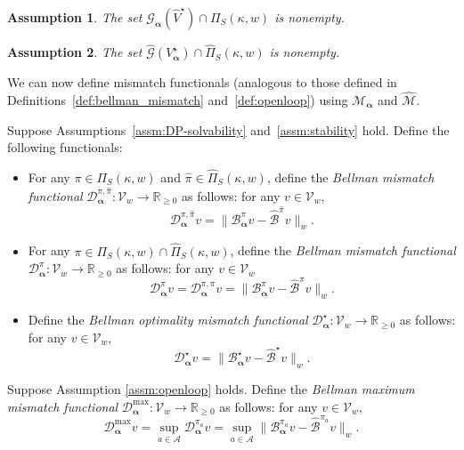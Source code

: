 \documentclass[letterpaper, 10pt]{IEEEtran}
\newtheorem{assumption}{Assumption}
\newcommand*\ALPHABET{\mathcal}
\newcommand*\reals{\mathds{R}}
\newcommand*\BELLMAN{\mathscr{B}}
\newcommand*\MISMATCH{\mathscr{D}}
\newcommand*\tuple{\kappa, w}
\begin{document}
\begin{assumption}\label{ass:N1_alt}
    The set $\ALPHABET G_{\boldsymbol{\alpha}}(\hat V^\star) \cap  \Pi_S(\tuple)$ is nonempty.
\end{assumption}
\begin{assumption}\label{ass:N2_alt}
    The set $\hat {\ALPHABET G}(V_{\boldsymbol{\alpha}}^\star) \cap  \hat \Pi_S(\tuple)$ is nonempty.
\end{assumption}
 
 We can now define mismatch functionals (analogous to those defined in Definitions~\ref{def:bellman_mismatch} and~\ref{def:openloop}) using $\ALPHABET M_{\boldsymbol{\alpha}}$ and $\hat {\ALPHABET M}$.
 
 \begin{definition}
\label{def:bellman_mismatch_alpha}
Suppose Assumptions~\ref{assm:DP-solvability} and~\ref{assm:stability} hold. Define the following functionals:
\begin{itemize}
    \item For any $\pi \in \Pi_S(\tuple)$ and $\hat\pi \in \hat \Pi_S(\tuple)$, define the \emph{Bellman mismatch functional}  $\MISMATCH_{\boldsymbol{\alpha}}^{\pi,\hat\pi} \colon \ALPHABET V_w \to \reals_{\ge 0}$  as follows: for any $v \in \ALPHABET V_w$,
    \[
        \MISMATCH^{\pi,\hat\pi}_{\boldsymbol{\alpha}} v = \| \BELLMAN^{\pi}_{\boldsymbol{\alpha}} v - \hat{\BELLMAN}^{\hat \pi} v \|_w.
    \]

    \item For any $\pi \in \Pi_S(\tuple) \cap \hat \Pi_S(\tuple)$, define the \emph{Bellman mismatch functional} $\MISMATCH^\pi_{\boldsymbol{\alpha}} \colon \ALPHABET V_w \to \reals_{\ge 0}$ as follows: for any $v \in \ALPHABET V_w$ 
    \[
        \MISMATCH^\pi_{\boldsymbol{\alpha}} v = \MISMATCH^{\pi,\pi}_{\boldsymbol{\alpha}}v= \| \BELLMAN^{\pi}_{\boldsymbol{\alpha}}v - \hat{\BELLMAN}^{\pi}v \|_w.
    \]
    
    \item Define the \emph{Bellman optimality mismatch functional} $\MISMATCH^\star_{\boldsymbol{\alpha}} \colon \ALPHABET V_w \to \reals_{\ge 0}$  as follows: for any $v \in \ALPHABET V_w$, 
    \[
         \MISMATCH_{\boldsymbol{\alpha}}^{\star}v = \| \BELLMAN^{\star}_{\boldsymbol{\alpha}} v - \hat{\BELLMAN}^{\star} v \|_w.
    \]
    
\end{itemize}
\end{definition}

\begin{definition}
     Suppose Assumption \ref{assm:openloop} holds. Define the \emph{Bellman maximum mismatch functional} $\MISMATCH^{\max}_{\boldsymbol{\alpha}} \colon \ALPHABET V_w \to \reals_{\ge 0}$  as follows: for any $v \in \ALPHABET V_w$, 
     \[
         \MISMATCH_{\boldsymbol{\alpha}}^{\max}v =\sup_{a \in \ALPHABET A} \MISMATCH_{\boldsymbol{\alpha}}^{\pi_a} v
         =\sup_{a \in  \ALPHABET A} \| \BELLMAN^{\pi_a}_{\boldsymbol{\alpha}}v - \hat{\BELLMAN}^{\pi_a}v \|_w .
     \]
\end{definition}
\end{document}
